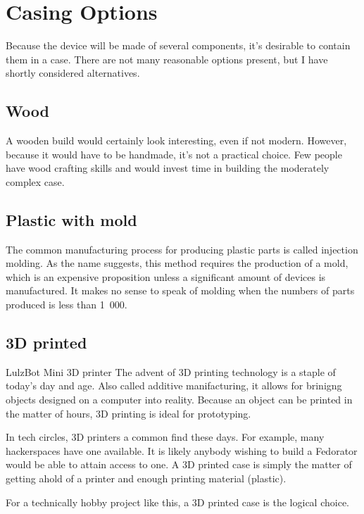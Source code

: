     \section{Casing Options}
        Because the device will be made of several components, it's desirable to contain them in a case.  There are not many reasonable options present, but I have shortly considered alternatives.
        \subsection{Wood}
            A wooden build would certainly look interesting, even if not modern.  However, because it would have to be handmade, it's not a practical choice.  Few people have wood crafting skills and would invest time in building the moderately complex case.
        
        \subsection{Plastic with mold}
            The common manufacturing process for producing plastic parts is called injection molding.  As the name suggests, this method requires the production of a mold, which is an expensive proposition unless a significant amount of devices is manufactured.  It makes no sense to speak of molding when the numbers of parts produced is less than 1~000\cite{rexplastics-mold-price}.
            
        \subsection{3D printed}
                {LulzBot Mini 3D printer\cite{lulzbot-mini}}
            The advent of 3D printing technology is a staple of today's day and age.  Also called additive manifacturing, it allows for brinigng objects designed on a computer into reality.  Because an object can be printed in the matter of hours, 3D printing is ideal for prototyping.
            
            In tech circles, 3D printers a common find these days.  For example, many hackerspaces have one available\cite{hackerspaces-3d-printers}. It is likely anybody wishing to build a Fedorator would be able to attain access to one.  A 3D printed case is simply the matter of getting ahold of a printer and enough printing material (plastic).
            
            For a technically hobby project like this, a 3D printed case is the logical choice.
            
